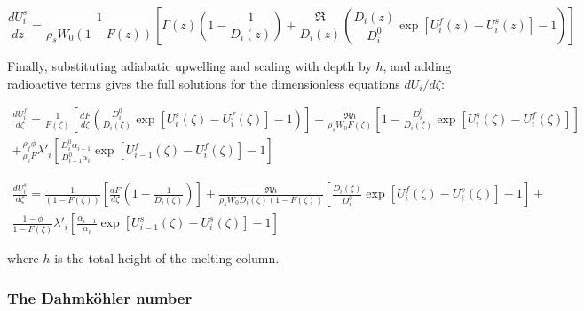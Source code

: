 \documentclass[draft]{agujournal2019}
\begin{document}
\begin{linenomath*}
\begin{equation}
    \frac{dU_i^s}{dz} = \frac{1}{\rho_s W_0 (1 - F(z))}\left[\Gamma(z) \left(1 - \frac{1}{D_i(z)}\right)+ \frac{\Re}{D_i(z)}\left(\frac{D_i(z)}{D_i^0} \exp[U_i^f(z) - U_i^s(z)] - 1\right) \right]\label{eq:47}
\end{equation}
\end{linenomath*}

Finally, substituting adiabatic upwelling and scaling with depth by $h$, and adding radioactive terms gives the full solutions for the dimensionless equations $dU_i/d\zeta$:

\begin{linenomath*}
\begin{equation}\label{eq:48}
    \begin{aligned}
    	\frac{dU_i^f}{d\zeta} = \frac{1}{F(\zeta)}\left[\frac{dF}{d\zeta}\left(\frac{D_i^0}{D_i(\zeta)}\exp[U_i^s(\zeta) - U_i^f(\zeta)] - 1\right)\right] - \frac{\Re h}{\rho_s W_0 F(\zeta)}\left[1 - \frac{D_i^0}{D_i(\zeta)}\exp[U_i^s(\zeta) - U_i^f(\zeta)]\right] \\
	+ \frac{\rho_f \phi}{\rho_s F}\lambda'_i \left[\frac{D_i^0 \alpha_{i-1}}{D_{i-1}^0 \alpha_i} \exp[U_{i-1}^f(\zeta) - U_i^f(\zeta)]-1\right]
    \end{aligned}
\end{equation}
\end{linenomath*}

\begin{linenomath*}
\begin{equation}\label{eq:49}
    \begin{aligned}
    	\frac{dU_i^s}{d\zeta} = \frac{1}{(1 - F(\zeta))}\left[\frac{dF}{d\zeta} \left(1 - \frac{1}{D_i(\zeta)}\right)\right]+ \frac{\Re h}{\rho_s W_0 D_i(\zeta)(1 - F(\zeta))}\left[\frac{D_i(\zeta)}{D_i^0} \exp[U_i^f(\zeta) - U_i^s(\zeta)] - 1 \right] + \\
	\frac{1-\phi}{1-F(\zeta)}\lambda'_i \left[\frac{\alpha_{i-1}}{\alpha_i} \exp[U_{i-1}^s(\zeta) - U_i^s(\zeta)]-1\right]
    \end{aligned}
\end{equation}
\end{linenomath*}

where $h$ is the total height of the melting column.


\subsubsection{The Dahmköhler number}
\end{document}
